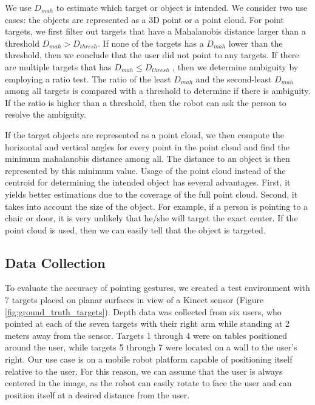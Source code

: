 We use $D_{mah}$ to estimate which target or object is intended. We consider two use cases: the objects are represented as a 3D point or a point cloud. For point targets, we first filter out targets that have a Mahalanobis distance larger than a threshold $D_{mah} > D_{thresh}$. If none of the targets has a $D_{mah}$ lower than the threshold, then we conclude that the user did not point to any targets. If there are multiple targets that has $D_{mah} \leq D_{thresh}$ , then we determine ambiguity by employing a ratio test. The ratio of the least $D_{mah}$ and the second-least $D_{mah}$ among all targets is compared with a threshold to determine if there is ambiguity. If the ratio is higher than a threshold, then the robot can ask the person to resolve the ambiguity.

If the target objects are represented as a point cloud, we then compute the horizontal and vertical angles for every point in the point cloud and find the minimum mahalanobis distance among all. The distance to an object is then represented by this minimum value. Usage of the point cloud instead of the centroid for determining the intended object has several advantages. First, it yields better estimations due to the coverage of the full point cloud. Second, it takes into account the size of the object. For example, if a person is pointing to a chair or door, it is very unlikely that he/she will target the exact center. If the point cloud is used, then we can easily tell that the object is targeted.

 
\subsection{Data Collection}
\label{sec:pointing_data_collection}

To evaluate the accuracy of pointing gestures, we created a test environment with 7 targets placed on planar surfaces in view of a Kinect sensor (Figure \ref{fig:ground_truth_targets}). Depth data was collected from six users, who pointed at each of the seven targets with their right arm while standing at 2 meters away from the sensor. Targets 1 through 4 were on tables positioned around the user, while targets 5 through 7 were located on a wall to the user's right. Our use case is on a mobile robot platform capable of positioning itself relative to the user.  For this reason, we can assume that the user is always centered in the image, as the robot can easily rotate to face the user and can position itself at a desired distance from the user.


